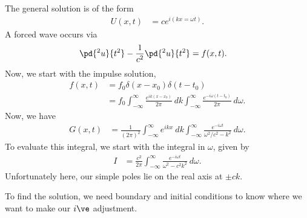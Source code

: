 \documentclass[10pt]{mypackage}
\begin{document}
  The general solution is of the form
  \begin{align*}
    U\left( x,t \right) &= ce^{i\left( kx = \omega t \right)}.
  \end{align*}
  A forced wave occurs via
  \begin{align*}
    \pd{^2u}{t^2} - \frac{1}{c^2} \pd{^2u}{t^2} &= f(x,t).
  \end{align*}
  Now, we start with the impulse solution,
  \begin{align*}
    f(x,t) &= f_0\delta\left( x-x_0 \right)\delta\left( t-t_0 \right)\\
           &= f_0 \int_{-\infty}^{\infty} \frac{e^{ik\left( x-x_0 \right)}}{2\pi}\:dk \int_{-\infty}^{\infty} \frac{e^{-i\omega\left( t-t_0 \right)}}{2\pi}\:d\omega.
  \end{align*}
  Now, we have
  \begin{align*}
    G(x,t) &= \frac{1}{\left( 2\pi \right)^2}\int_{-\infty}^{\infty} e^{ikx}\:dk\int_{-\infty}^{\infty} \frac{e^{-i\omega t}}{\omega^2/c^2 - k^2}\:d\omega.
  \end{align*}
  To evaluate this integral, we start with the integral in $\omega$, given by
  \begin{align*}
    I &= \frac{c^2}{2\pi}\int_{-\infty}^{\infty} \frac{e^{-i\omega t}}{\omega^2 - c^2k^2}\:d\omega.
  \end{align*}
  Unfortunately here, our simple poles lie on the real axis at $\pm ck$.\newline

  To find the solution, we need boundary and initial conditions to know where we want to make our $i\ve$ adjustment.\newline
\end{document}
